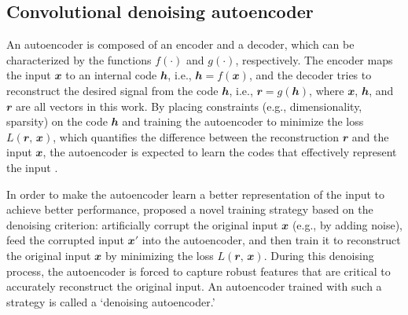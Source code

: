 \documentclass[fleqn,usenatbib]{mnras}
\newcommand{\B}[1]{\mathbfit{#1}}
\begin{document}
\subsection{Convolutional denoising autoencoder}
\label{sec:cdae}

An autoencoder is composed of an encoder and a decoder, which can be
characterized by the functions $f(\cdot)$ and $g(\cdot)$, respectively.
The encoder maps the input $\B{x}$ to an internal code $\B{h}$, i.e.,
$\B{h} = f(\B{x})$, and the decoder tries to reconstruct the desired
signal from the code $\B{h}$, i.e., $\B{r} = g(\B{h})$, where $\B{x}$,
$\B{h}$, and $\B{r}$ are all vectors in this work.
By placing constraints (e.g., dimensionality, sparsity) on the
code $\B{h}$ and training the autoencoder to minimize the
loss $L(\B{r}, \,\B{x})$, which quantifies the difference between the
reconstruction $\B{r}$ and the input $\B{x}$, the autoencoder is expected
to learn the codes that effectively represent the input
\citep[chapter 14]{goodfellow2016}.

In order to make the autoencoder learn a better representation of the input
to achieve better performance, \citet{vincent2008,vincent2010} proposed a
novel training strategy based on the denoising criterion:
artificially corrupt the original input $\B{x}$ (e.g., by adding noise),
feed the corrupted input $\B{x}'$ into the autoencoder, and then train it
to reconstruct the original input $\B{x}$ by minimizing the loss
$L(\B{r}, \,\B{x})$.
During this denoising process, the autoencoder is
forced to capture robust features that are critical to accurately
reconstruct the original input.
An autoencoder trained with such a strategy
is called a `denoising autoencoder.'
\end{document}
